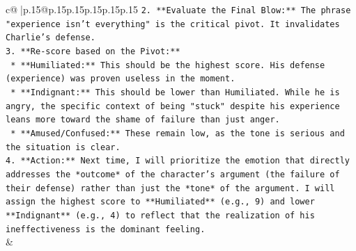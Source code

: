 \documentclass{article}
\begin{document}
{\begin{supertabular}{c@{$\;$}|p{.15\linewidth}@{}p{.15\linewidth}p{.15\linewidth}p{.15\linewidth}p{.15\linewidth}p{.15\linewidth}}
{{{\texttt{2.  **Evaluate the Final Blow:** The phrase "experience isn't everything" is the critical pivot. It invalidates Charlie's defense.} \\
\texttt{3.  **Re{-}score based on the Pivot:**} \\
\texttt{    *   **Humiliated:** This should be the highest score. His defense (experience) was proven useless in the moment.} \\
\texttt{    *   **Indignant:** This should be lower than Humiliated. While he is angry, the specific context of being "stuck" despite his experience leans more toward the shame of failure than just anger.} \\
\texttt{    *   **Amused/Confused:** These remain low, as the tone is serious and the situation is clear.} \\
\texttt{4.  **Action:** Next time, I will prioritize the emotion that directly addresses the *outcome* of the character's argument (the failure of their defense) rather than just the *tone* of the argument. I will assign the highest score to **Humiliated** (e.g., 9) and lower **Indignant** (e.g., 4) to reflect that the realization of his ineffectiveness is the dominant feeling.} \\
            }
        }
    }
    & \\ \\

\end{supertabular}
}
\end{document}
